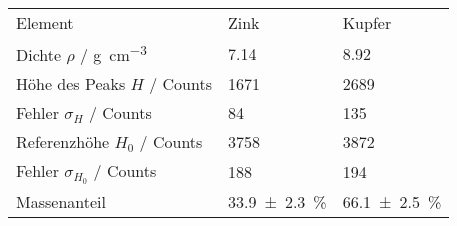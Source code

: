 \begin{tabular}{p{5cm}|ll}
\toprule

Element 										& {Zink}	& {Kupfer} 	\\
Dichte $\rho$ / \si{\gram\per\cubic\centi\metre}& \num{7.14}& \num{8.92}\\
Höhe des Peaks $H$ / Counts						& 1671 		& 2689		\\
Fehler $\sigma_H$ / Counts						& 84		& 135		\\
Referenzhöhe $H_0$ / Counts 					& 3758		& 3872		\\
Fehler $\sigma_{H_0}$ / Counts					& 188		& 194		\\
Massenanteil									& {\SI{33,9+-2,3}{\percent}}&{\SI{66,1+-2,5}{\percent}}\\

\bottomrule
\end{tabular}